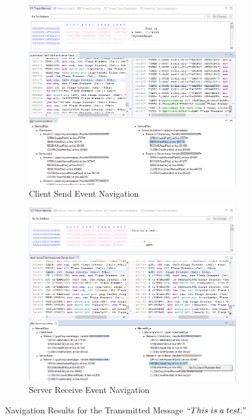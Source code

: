 \begin{figure}[H]
\begin{subfigure}[H]{0.45\linewidth}
\includegraphics[scale=0.35]{Figures/result1_client_send}
 \caption{Client Send Event Navigation}
\label{result1_client_send}
\end{subfigure}
\hfill
\begin{subfigure}[H]{0.45\linewidth}
\includegraphics[scale=0.35]{Figures/result1_server_read}
 \caption{Server Receive Event Navigation}
\label{result1_server_read}
\end{subfigure}%
\caption{Navigation Results for the Transmitted Message $``This\; is\; a\; test."$}
\label{result1_client_to_server}
\end{figure}


